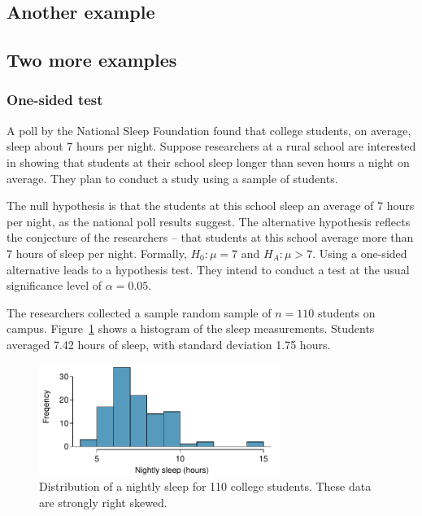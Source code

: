\begin{spacing}{1.5}
\subsection{Another example}





\subsection{Two more examples}
\label{hypothesisTestingExamples}


\subsubsection{One-sided test}


A poll by the National Sleep Foundation found that college students, on average, sleep about 7 hours per night. Suppose researchers at a rural school are interested in showing that students at their school sleep longer than seven hours a night on average. They plan to conduct a study using a sample of students.

The null hypothesis is that the students at this school sleep an average of 7 hours per night, as the national poll results suggest. The alternative hypothesis reflects the conjecture of the researchers -- that students at this school average more than 7 hours of sleep per night. Formally, $H_0: \mu = 7$ and $H_A: \mu > 7$. Using a one-sided alternative leads to a  hypothesis test. They intend to conduct a test at the usual significance level of $\alpha = 0.05$.

The researchers collected a sample random sample of $n = 110$ students on campus. Figure~\ref{histOfSleepForCollegeThatWasCheckingForMoreThan7Hours} shows a histogram of the sleep measurements. Students averaged 7.42 hours of sleep, with standard deviation 1.75 hours. 

\begin{figure}[h]
	\centering
	\includegraphics[width=0.7\textwidth]{ch_inference_foundations_oi_biostat/figures/histOfSleepForCollegeThatWasCheckingForMoreThan7Hours/histOfSleepForCollegeThatWasCheckingForMoreThan7Hours}
	\caption{Distribution of a nightly sleep for 110 college students. These data are strongly right skewed.}
	\label{histOfSleepForCollegeThatWasCheckingForMoreThan7Hours}
\end{figure}


\end{spacing}
